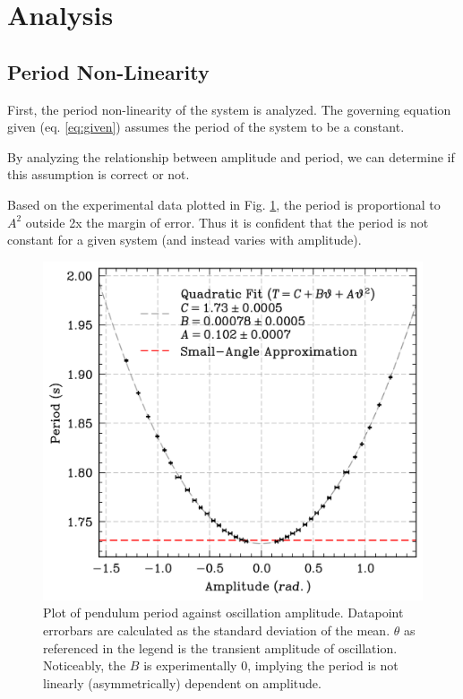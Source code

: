 \documentclass[prl,twocolumn,amsmath,amssymb,superscriptaddress]{revtex4-2}
\begin{document}
\section{Analysis}


\subsection{Period Non-Linearity}

First, the period non-linearity of the system is analyzed. The governing equation given (eq. \ref{eq:given}) assumes the period of the system to be a constant.

By analyzing the relationship between amplitude and period, we can determine if this assumption is correct or not.

Based on the experimental data plotted in Fig. \ref{fig:amplitude-period}, the period is proportional to $A^2$ outside 2x the margin of error. Thus it is confident that the period is not constant for a given system (and instead varies with amplitude).


\begin{figure}[htb]
    \hspace{-20pt}
    \includegraphics[width=0.85\linewidth]{amp_per_error_of_mean.png}
    \caption{Plot of pendulum period against oscillation amplitude. Datapoint errorbars are calculated as the standard deviation of the mean. $\theta$ as referenced in the legend is the transient amplitude of oscillation. Noticeably, the $B$ is experimentally 0, implying the period is not linearly (asymmetrically) dependent on amplitude.}
    \label{fig:amplitude-period}
\end{figure}
\end{document}
